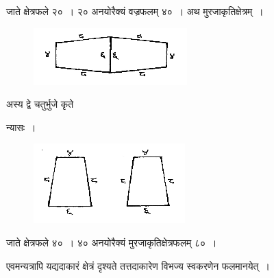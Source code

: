 \documentclass[11pt, openany]{book}
\begin{document}
जाते क्षेत्रफले २०~। २० अनयोरैक्यं वज्रफलम् ४०~।
\newpage
\setcounter{footnote}{0}
 अथ मुरजाकृतिक्षेत्रम्~। 
\vspace{-2mm}

\begin{figure}[h!]
    \centering
    \includegraphics[scale=0.8]{graphics/capture15.png}
\captionsetup{labelformat=empty}
\end{figure}
\vspace{-2mm}

अस्य द्वे चतुर्भुजे कृते
\vspace{2mm}

 न्यासः~। 
\begin{figure}[h!]
    \centering
    \includegraphics[scale=0.8]{graphics/capture16.png}
\end{figure}
\vspace{-2mm}

 जाते क्षेत्रफले ४०~। ४० अनयोरैक्यं मुरजाकृतिक्षेत्रफलम् ८०~। 
 \vspace{2mm}
 
 एवमन्यत्रापि यद्यदाकारं क्षेत्रं दृश्यते तत्तदाकारेण विभज्य स्वकरणेन
फलमानयेत्~। \\
\end{document}
